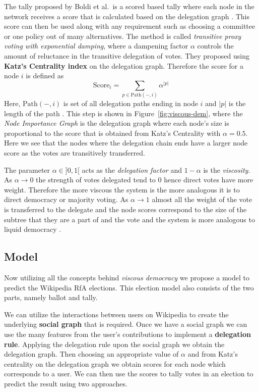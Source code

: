 The tally proposed by Boldi et al.\ is a scored based tally where each node in the network receives a score that is calculated based on the delegation graph \cite{ViscousDemocracy}. This score can then be used along with any requirement such as choosing a committee or one policy out of many alternatives. The method is called \textit{transitive proxy voting with exponential damping}, where a dampening factor $\alpha$ controls the amount of reluctance in the transitive delegation of votes. They proposed using \textbf{Katz's Centrality index} on the delegation graph. Therefore the score for a node $i$ is defined as 
\[\text{Score}_{i}  = \sum_{p \in \text{Path}(-,i)} \alpha^{|p|}\]
Here, $\text{Path}(-,i)$ is set of all delegation paths ending in node $i$ and $|p|$ is the length of the path \cite{ViscousDemocracy}. This step is shown in Figure~\ref{fig:viscous-dem}, where the \textit{Node Importance Graph} is the delegation graph where each node's size is proportional to the score that is obtained from Katz's Centrality with $\alpha=0.5$. Here we see that the nodes where the delegation chain ends have a larger node score as the votes are transitively transferred.

The parameter $\alpha\in ]0,1[$ acts as the \textit{delegation factor} and $1-\alpha$ is the \textit{viscosity}. As $\alpha\rightarrow 0$ the strength of votes delegated tend to $0$ hence direct votes have more weight. Therefore the more viscous the system is the more analogous it is to direct democracy or majority voting. As $\alpha\rightarrow 1$ almost all the weight of the vote is transferred to the delegate and the node scores correspond to the size of the subtree that they are a part of and the vote and the system is more analogous to liquid democracy \cite{ViscousDemocracy}.

\subsection{Model} 
Now utilizing all the concepts behind \textit{viscous democracy} we propose a model to predict the Wikipedia RfA elections. This election model also consists of the two parts, namely ballot and tally. 

We can utilize the interactions between users on Wikipedia to create the underlying \textbf{social graph} that is required. Once we have a social graph we can use the many features from the user's contributions to implement a \textbf{delegation rule}. Applying the delegation rule upon the social graph we obtain the delegation graph. Then choosing an appropriate value of $\alpha$ and from Katz's centrality on the delegation graph we obtain scores for each node which corresponds to a user. We can then use the scores to tally votes in an election to predict the result using two approaches.

